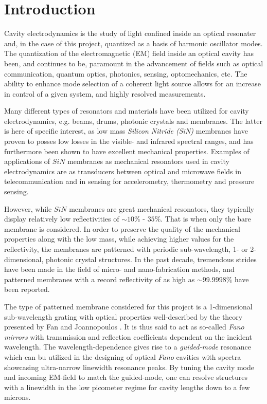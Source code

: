 \newpage
\section{Introduction}

Cavity electrodynamics\cite{Haroche} is the study of light confined inside an optical resonater and, in the case of this project, quantized as a basis of harmonic oscillator modes\cite{Sakurai}. The quantization of the electromagnetic (EM) field inside an optical cavity has been, and continues to be, paramount in the advancement of fields such as optical communication, quantum optics, photonics, sensing, optomechanics\cite{Monsel,Sankey}, etc. The ability to enhance mode selection of a coherent light source allows for an increase in control of a given system, and highly resolved measurements\cite{Vahala}. 

Many different types of resonators and materials have been utilized for cavity electrodynamics, e.g. beams, drums, photonic crystals and membranes\cite{Thompson,Jayich}. The latter is here of specific interest, as low mass \emph{Silicon Nitride (SiN)} membranes\cite{Wilson} have proven to posses low losses in the visible- and infrared spectral ranges\cite{Land}, and has furthermore been shown to have excellent mechanical properties\cite{Seis,Cupertino}. Examples of applications of $SiN$ membranes as mechanical resonators used in cavity electrodynamics are as transducers between optical and microwave fields in telecommunication\cite{Bagci,Andrews} and in sensing for accelerometry\cite{Chowdhury,Manley}, thermometry\cite{Ferreiro-Vila,Zhang,Nair_thesis} and pressure sensing\cite{Naserbakht,Al-Sumaidae,Hornig,Salimi}. 

However, while $SiN$ membranes are great mechanical resonators, they typically display relatively low reflectivities of $\sim 10\%$ - $35\%$. That is when only the bare membrane is considered. In order to preserve the quality of the mechanical properties along with the low mass, while achieving higher values for the reflectivity, the membranes are patterned with periodic sub-wavelength, 1- or 2-dimensional, photonic crystal structures\cite{Kemiktarak,Kemiktarak2,Bui,Norte,Reinhardt,Chen,Zhou}. In the past decade, tremendous strides have been made in the field of micro- and nano-fabrication methods, and patterned membranes with a record reflectivity of as high as $\sim 99.9998\%$ have been reported. 

The type of patterned membrane considered for this project is a 1-dimensional sub-wavelength grating with optical properties well-described by the theory presented by Fan and Joannopoulos \cite{Fan-Joannopoulos-guided-mode-resonance,Fan-Joannopoulos-fano-resonance}. It is thus said to act as so-called \emph{Fano mirrors} with transmission and reflection coefficients dependent on the incident wavelength. The wavelength-dependence gives rise to a \emph{guided-mode} resonance which can bu utilized in the designing of optical \emph{Fano} cavities with spectra showcasing ultra-narrow linewidth resonance peaks. By tuning the cavity mode and incoming EM-field to match the guided-mode, one can resolve structures with a linewidth in the low picometer regime for cavity lengths down to a few microns. 

